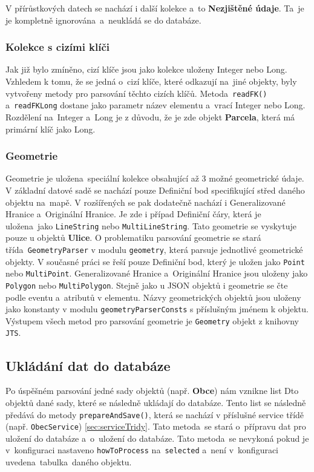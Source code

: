 V přírůstkových datech se nachází i další kolekce a~to \textbf{Nezjištěné údaje}.
Ta~je je kompletně ignorována~a~neukládá se do databáze.

\subsubsection*{Kolekce s cizími klíči}
Jak již bylo zmíněno, cizí klíče jsou jako kolekce uloženy Integer nebo Long.
Vzhledem k tomu, že se jedná o~cizí klíče, které odkazují na~jiné objekty,
byly vytvořeny metody pro parsování těchto cizích klíčů.
Metoda~\texttt{readFK()} a~\texttt{readFKLong} dostane jako parametr název elementu a~vrací Integer nebo Long.
Rozdělení na~Integer a~Long je z důvodu, že je zde objekt \textbf{Parcela}, která má primární klíč jako Long.

\subsubsection*{Geometrie}
Geometrie je uložena~speciální kolekce obsahující až 3 možné geometrické údaje.
V základní datové sadě se nachází pouze Definiční bod specifikující střed daného objektu na~mapě.
V rozšířených se pak dodatečně nachází i Generalizované Hranice a~Originální Hranice.
Je zde i případ Definiční čáry, která je uložena~jako \texttt{LineString} nebo \texttt{MultiLineString}.
Tato geometrie se vyskytuje pouze u objektů \textbf{Ulice}.
O problematiku parsování geometrie se stará třída~\texttt{GeometryParser} v modulu \texttt{geometry}, která parsuje jednotlivé geometrické objekty.
V současné práci se řeší pouze Definiční bod, který je uložen jako \texttt{Point} nebo \texttt{MultiPoint}.
Generalizované Hranice a~Originální Hranice jsou uloženy jako \texttt{Polygon} nebo \texttt{MultiPolygon}.
Stejně jako u JSON objektů i geometrie se čte podle eventu a~atributů v elementu.
Názvy geometrických objektů jsou uloženy jako konstanty v modulu \texttt{geometryParserConsts} s příslušným jménem k objektu.
Výstupem všech metod pro parsování geometrie je \texttt{Geometry} objekt z knihovny \texttt{JTS}.

\newpage

\subsection{Ukládání dat do databáze}
Po úspěšném parsování jedné sady objektů (např. \textbf{Obce}) nám vznikne list Dto objektů
dané sady, které se následně ukládají do databáze. Tento list se následně předává do metody \texttt{prepareAndSave()},
která se nachází v příslušné service třídě (např. \texttt{ObecService}) \ref{sec:serviceTridy}.
Tato metoda~se stará o~přípravu dat pro uložení do databáze a~o~uložení do databáze.
Tato metoda~se nevykoná pokud je v~konfiguraci nastaveno \texttt{howToProcess} na~\texttt{selected}
a~není v~konfiguraci uvedena~tabulka~daného objektu.

